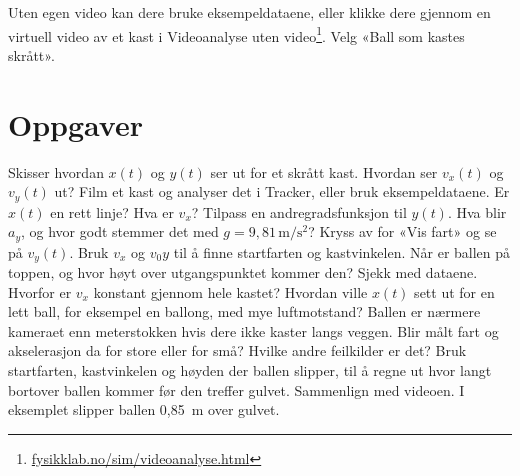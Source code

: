 \documentclass[11pt]{article}
\begin{document}
Uten egen video kan dere bruke eksempeldataene, eller klikke dere gjennom en virtuell video av et kast i Videoanalyse uten video\footnote{\url{fysikklab.no/sim/videoanalyse.html}}. Velg «Ball som kastes skrått».

\section*{Oppgaver}

\begin{oppgaveliste}
\oppgave {}Skisser hvordan $x(t)$ og $y(t)$ ser ut for et skrått kast. Hvordan ser $v_{x}(t)$ og $v_{y}(t)$ ut?
\svar
\oppgave {}Film et kast og analyser det i Tracker, eller bruk eksempeldataene. Er $x(t)$ en rett linje? Hva er $v_{x}$?
\svar
\oppgave {}Tilpass en andregradsfunksjon til $y(t)$. Hva blir $a_{y}$, og hvor godt stemmer det med $g = 9{,}81\,\mathrm{m/s^{2}}$? Kryss av for «Vis fart» og se på $v_{y}(t)$.
\svar
\oppgave {}Bruk $v_{x}$ og $v_{0}y$ til å finne startfarten og kastvinkelen. Når er ballen på toppen, og hvor høyt over utgangspunktet kommer den? Sjekk med dataene.
\svar
\oppgave {}Hvorfor er $v_{x}$ konstant gjennom hele kastet? Hvordan ville $x(t)$ sett ut for en lett ball, for eksempel en ballong, med mye luftmotstand?
\svar
\oppgave {}Ballen er nærmere kameraet enn meterstokken hvis dere ikke kaster langs veggen. Blir målt fart og akselerasjon da for store eller for små? Hvilke andre feilkilder er det?
\svar
\oppgave {}Bruk startfarten, kastvinkelen og høyden der ballen slipper, til å regne ut hvor langt bortover ballen kommer før den treffer gulvet. Sammenlign med videoen. I eksemplet slipper ballen 0,85~m over gulvet.
\svar
\end{oppgaveliste}
\end{document}
